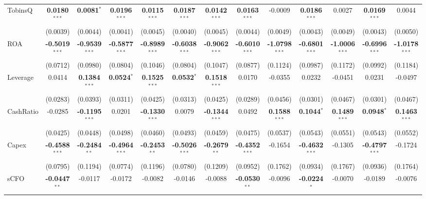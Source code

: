 \begin{landscape}
\begin{table}[H]
\begin{tabular}{lcccccccccccc}
TobinsQ & \textbf{0.0180}$^{***}$ & \textbf{0.0081}$^{*}$ & \textbf{0.0196}$^{***}$ & \textbf{0.0115}$^{***}$ & \textbf{0.0187}$^{***}$ & \textbf{0.0142}$^{***}$ & \textbf{0.0163}$^{***}$ & -0.0009 & \textbf{0.0186}$^{***}$ & 0.0027 & \textbf{0.0169}$^{***}$ & 0.0044 \\
 & (0.0039) & (0.0044) & (0.0041) & (0.0045) & (0.0040) & (0.0045) & (0.0044) & (0.0049) & (0.0043) & (0.0049) & (0.0043) & (0.0050) \\
ROA & \textbf{-0.5019}$^{***}$ & \textbf{-0.9539}$^{***}$ & \textbf{-0.5877}$^{***}$ & \textbf{-0.8989}$^{***}$ & \textbf{-0.6038}$^{***}$ & \textbf{-0.9062}$^{***}$ & \textbf{-0.6010}$^{***}$ & \textbf{-1.0798}$^{***}$ & \textbf{-0.6801}$^{***}$ & \textbf{-1.0006}$^{***}$ & \textbf{-0.6996}$^{***}$ & \textbf{-1.0178}$^{***}$ \\
 & (0.0712) & (0.0980) & (0.0804) & (0.1046) & (0.0804) & (0.1047) & (0.0877) & (0.1124) & (0.0987) & (0.1172) & (0.0992) & (0.1184) \\
Leverage & 0.0414 & \textbf{0.1384}$^{***}$ & \textbf{0.0524}$^{*}$ & \textbf{0.1525}$^{***}$ & \textbf{0.0532}$^{*}$ & \textbf{0.1518}$^{***}$ & 0.0170 & -0.0355 & 0.0232 & -0.0451 & 0.0231 & -0.0497 \\
 & (0.0283) & (0.0393) & (0.0311) & (0.0425) & (0.0313) & (0.0425) & (0.0289) & (0.0456) & (0.0301) & (0.0467) & (0.0301) & (0.0467) \\
CashRatio & -0.0285 & \textbf{-0.1195}$^{***}$ & 0.0201 & \textbf{-0.1330}$^{***}$ & 0.0079 & \textbf{-0.1344}$^{***}$ & 0.0492 & \textbf{0.1588}$^{***}$ & \textbf{0.1044}$^{*}$ & \textbf{0.1489}$^{***}$ & \textbf{0.0948}$^{*}$ & \textbf{0.1463}$^{***}$ \\
 & (0.0425) & (0.0448) & (0.0498) & (0.0460) & (0.0493) & (0.0459) & (0.0475) & (0.0537) & (0.0543) & (0.0551) & (0.0543) & (0.0552) \\
Capex & \textbf{-0.4588}$^{***}$ & \textbf{-0.2484}$^{**}$ & \textbf{-0.4964}$^{***}$ & \textbf{-0.2453}$^{**}$ & \textbf{-0.5026}$^{***}$ & \textbf{-0.2679}$^{**}$ & \textbf{-0.4352}$^{***}$ & -0.1654 & \textbf{-0.4632}$^{***}$ & -0.1305 & \textbf{-0.4797}$^{***}$ & -0.1724 \\
 & (0.0795) & (0.1194) & (0.0774) & (0.1196) & (0.0780) & (0.1209) & (0.0952) & (0.1762) & (0.0934) & (0.1767) & (0.0936) & (0.1764) \\
sCFO & \textbf{-0.0447}$^{**}$ & -0.0117 & -0.0172 & -0.0082 & -0.0146 & -0.0088 & \textbf{-0.0530}$^{**}$ & -0.0096 & \textbf{-0.0224}$^{*}$ & -0.0070 & -0.0189 & -0.0076 \\

\end{tabular}
\end{table}
\end{landscape}
